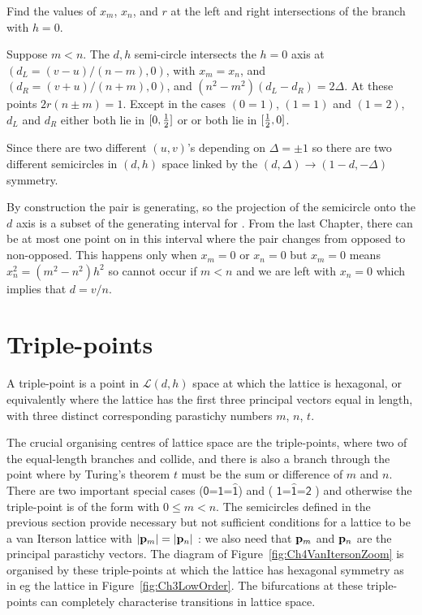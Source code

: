 \begin{jExercise}
	Find the values of $x_m$, $x_n$, and $r$ at the left and right
	intersections of the  branch with $h=0$.
	
\end{jExercise}
\begin{jAnswer}
	Suppose $m<n$. The $d,h$ semi-circle intersects the $h=0$ axis 
	at $(d_L= (v-u)/(n-m),0)$, with $x_m=x_n$, and $(d_R=(v+u)/(n+m),0)$, 
	and $(n^2-m^2)(d_L-d_R) = 2\Delta$. 
	At these points $2r(n\pm m)=1$.
Except in the cases $(0=1)$, $(1=1)$ and $(1=2)$,  $d_L$ and $d_R$ either both lie in $[0,\textstyle{\frac{1}{2}}]$ or or both lie in $[\textstyle{\frac{1}{2}},0]$.
\end{jAnswer}



Since there are two different $(u,v)$'s depending on $\Delta=\pm 1$ so there are two different semicircles in $(d,h)$ space linked by the $(d,\Delta)\rightarrow(1-d,-\Delta)$ symmetry.

By construction the pair is generating, so the projection of the semicircle onto the $d$ axis is a subset of the generating interval for . From the last Chapter, there can be at most one point on in this interval where the pair changes from opposed to non-opposed. This happens only when $x_m=0$ or $x_n=0$ but
$x_m=0$ means $x_n^2=(m^2-n^2)h^2$ so cannot occur if $m<n$  and we are left with $x_n=0$ which implies that $d=v/n$. 


\section{Triple-points}
\label{sec:triplep}
\begin{definition}
	A {triple-point}  is a point in $\mathcal{L}(d,h)$ space at which the lattice is hexagonal, or equivalently where the lattice has the first three  principal vectors equal in length, with three distinct corresponding parastichy numbers $m$, $n$, $t$. 
\end{definition}
The crucial organising centres of lattice space are the triple-points, where two of the equal-length branches  and  collide, and there is also a branch  through the point where by Turing's theorem $t$ must be the sum or difference of $m$ and $n$. There are two important special cases
\textsf{	 (\ensuremath{\textsf{0=1=}\hat{\textsf{1}}})}
  and 
\textsf{   (
\ensuremath{ 
	\textsf{1=}
	\hat{\textsf{1}}
	\textsf{=2}}
)}
and otherwise the  triple-point is of the form  with $0\leq m<n$. 
The semicircles defined in the previous section provide necessary but not sufficient conditions for a lattice to be a van Iterson lattice with $|{\mathbf p}_{m}|=|{\mathbf p}_{n}|$ : we also need that ${\mathbf p}_{m}$ and ${\mathbf p}_{n}$ are the principal parastichy vectors. 
The diagram of  Figure~\ref{fig:Ch4VanItersonZoom} is organised by these triple-points  at which the lattice has hexagonal symmetry as in eg the  lattice in Figure~\ref{fig:Ch3LowOrder}. The bifurcations at these triple-points can completely characterise transitions in lattice space.

